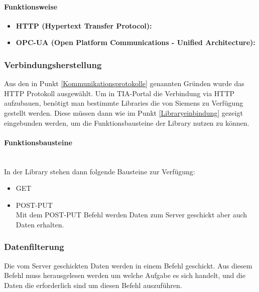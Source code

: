         \paragraph{Funktionsweise}

            \begin{itemize}
                \item \textbf{{HTTP (Hypertext Transfer Protocol):}} \mbox{} \\
                
            
                \item \textbf{{OPC-UA (Open Platform Communications - Unified Architecture):}} \mbox{} \\
                
            \end{itemize}
        
            

    
    \subsubsection{Verbindungsherstellung}
    Aus den in Punkt \ref{Kommunikationsprotokolle} genannten Gründen wurde das HTTP Protokoll ausgewählt. Um in TIA-Portal die Verbindung via HTTP aufzubauen, benötigt man bestimmte Libraries die von Siemens zu Verfügung gestellt werden. Diese müssen dann wie im Punkt \ref{Libraryeinbindung} gezeigt eingebunden werden, um die Funktionsbausteine der Library nutzen zu können. 

        \paragraph{Funktionsbausteine} \mbox{} \\
        In der Library stehen dann folgende Bausteine zur Verfügung:

        \begin{itemize}
            \item GET
            \item POST-PUT \\
            Mit dem POST-PUT Befehl werden Daten zum Server geschickt aber auch Daten erhalten. 
        \end{itemize}


    \subsubsection{Datenfilterung}
    Die vom Server geschickten Daten werden in einem Befehl geschickt. Aus diesem Befehl muss herausgelesen werden um welche Aufgabe es sich handelt, und die Daten die erforderlich sind um diesen Befehl auszuführen.

